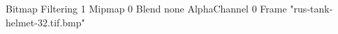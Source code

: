 {Bitmap
	{Filtering 1}
	{Mipmap 0}
	{Blend none}
	{AlphaChannel 0}
	{Frame "rus-tank-helmet-32.tif.bmp"}
}
